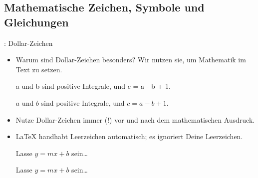 \documentclass{beamer}
\begin{document}
\subsection{Mathematische Zeichen, Symbole und Gleichungen}
\begin{frame}[fragile]{\insertsubsection{}: Dollar-Zeichen}
\begin{itemize}
\item Warum sind Dollar-Zeichen \keystrokebftt{\$} besonders? Wir nutzen sie, um Mathematik im Text zu setzen.\\[1ex]
\begin{exampletwouptiny}
a und b sind positive Integrale, 
und c = a - b + 1.


$a$ und $b$ sind positive Integrale, 
und $c = a - b + 1$.
\end{exampletwouptiny}
\item Nutze Dollar-Zeichen immer (!) vor und nach dem mathematischen Ausdruck.
\item \LaTeX{} handhabt Leerzeichen automatisch; es ignoriert Deine Leerzeichen.
\begin{exampletwouptiny}
Lasse $y=mx+b$ sein\ldots

Lasse $y = m x + b$ sein\ldots
\end{exampletwouptiny}
\end{itemize}
\end{frame}
\end{document}
